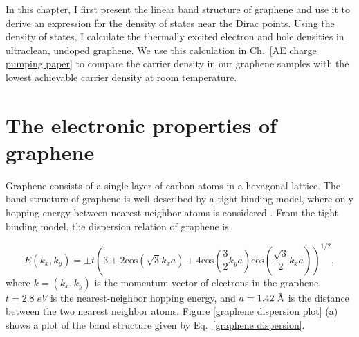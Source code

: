 \documentclass[double,12pt,1in,seploa]{beavtex}
\let\Oldsection\section
\renewcommand{\section}{\FloatBarrier\Oldsection}
\begin{document}
In this chapter, I first present the linear band structure of graphene and use it to derive an expression for the density of states near the Dirac points. Using the density of states, I calculate the thermally excited electron and hole densities in ultraclean, undoped graphene. We use this calculation in Ch.\ \ref{AE charge pumping paper} to compare the carrier density in our graphene samples with the lowest achievable carrier density at room temperature.

\section{The electronic properties of graphene} \label{the electronic properties of graphene}

Graphene consists of a single layer of carbon atoms in a hexagonal lattice. The band structure of graphene is well-described by a tight binding model, where only hopping energy between nearest neighbor atoms is considered \cite{wallace_band_1947}. From the tight binding model, the dispersion relation of graphene is 

\begin{equation}
    E(k_x, k_y) = \pm t  \left(3 + 2\mathrm{cos}(\sqrt{3}k_x a) + 4\mathrm{cos}(\frac{3}{2}k_y a)\mathrm{cos}(\frac{\sqrt{3}}{2}k_x a)\right)^{1/2}, \label{graphene dispersion}
\end{equation}
where $k = (k_x, k_y)$ is the momentum vector of electrons in the graphene, $t = 2.8 \; eV$ is the nearest-neighbor hopping energy, and $a = 1.42 \;\SIUnitSymbolAngstrom$ is the distance between the two nearest neighbor atoms. Figure \ref{graphene dispersion plot} (a) shows a plot of the band structure given by Eq.\ \ref{graphene dispersion}.
\end{document}
